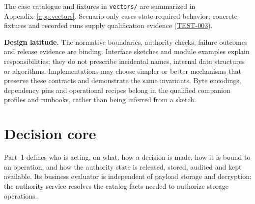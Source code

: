 \documentclass[11pt,a4paper]{article}
\newcommand{\rr}[1]{\hyperlink{req:#1}{#1}}
\begin{document}
The case catalogue and fixtures in \texttt{vectors/} are summarized in Appendix~\ref{app:vectors}. Scenario-only cases state required behavior; concrete fixtures and recorded runs supply qualification evidence (\rr{TEST-003}).

\textbf{Design latitude.} The normative boundaries, authority checks, failure outcomes and release evidence are binding. Interface sketches and module examples explain responsibilities; they do not prescribe incidental names, internal data structures or algorithms. Implementations may choose simpler or better mechanisms that preserve these contracts and demonstrate the same invariants. Byte encodings, dependency pins and operational recipes belong in the qualified companion profiles and runbooks, rather than being inferred from a sketch.


\section{Decision core}\label{sec:decision}
Part~1 defines who is acting, on what, how a decision is made, how it is bound to an operation, and how the authority state is released, stored, audited and kept available. Its business evaluator is independent of payload storage and decryption; the authority service resolves the catalog facts needed to authorize storage operations.
\end{document}
